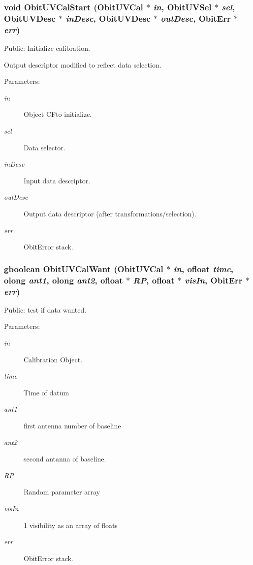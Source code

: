 \subsubsection{\setlength{\rightskip}{0pt plus 5cm}void Obit\-UVCal\-Start ({\bf Obit\-UVCal} $\ast$ {\em in}, {\bf Obit\-UVSel} $\ast$ {\em sel}, {\bf Obit\-UVDesc} $\ast$ {\em in\-Desc}, {\bf Obit\-UVDesc} $\ast$ {\em out\-Desc}, {\bf Obit\-Err} $\ast$ {\em err})}\label{ObitUVCal_8c_a12}


Public: Initialize calibration. 

Output descriptor modified to reflect data selection. \begin{Desc}
\item[Parameters:]
\begin{description}
\item[{\em in}]Object CFto initialize. \item[{\em sel}]Data selector. \item[{\em in\-Desc}]Input data descriptor. \item[{\em out\-Desc}]Output data descriptor (after transformations/selection). \item[{\em err}]Obit\-Error stack. \end{description}
\end{Desc}
\subsubsection{\setlength{\rightskip}{0pt plus 5cm}gboolean Obit\-UVCal\-Want ({\bf Obit\-UVCal} $\ast$ {\em in}, {\bf ofloat} {\em time}, {\bf olong} {\em ant1}, {\bf olong} {\em ant2}, {\bf ofloat} $\ast$ {\em RP}, {\bf ofloat} $\ast$ {\em vis\-In}, {\bf Obit\-Err} $\ast$ {\em err})}\label{ObitUVCal_8c_a15}


Public: test if data wanted. 

\begin{Desc}
\item[Parameters:]
\begin{description}
\item[{\em in}]Calibration Object. \item[{\em time}]Time of datum \item[{\em ant1}]first antenna number of baseline \item[{\em ant2}]second antanna of baseline. \item[{\em RP}]Random parameter array \item[{\em vis\-In}]1 visibility as an array of floats \item[{\em err}]Obit\-Error stack. \end{description}
\end{Desc}
